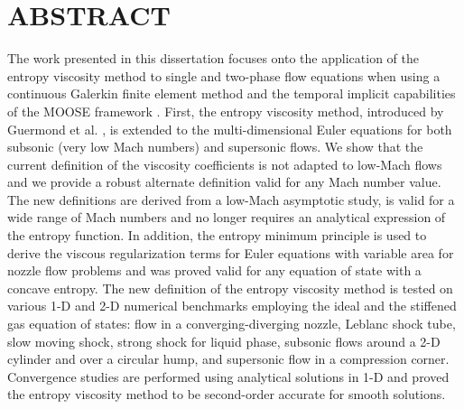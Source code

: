 %
%
%

\chapter*{ABSTRACT}

\pagestyle{plain} %
\setcounter{page}{2}

The work presented in this dissertation focuses onto the application of the entropy viscosity method to single and two-phase flow equations when using a continuous Galerkin finite element method and the temporal implicit capabilities of the MOOSE framework \cite{Moose}. First,  
the entropy viscosity method, introduced by Guermond et al. \cite{jlg1, jlg2}, is extended to the multi-dimensional Euler 
equations for both subsonic (very low Mach numbers) and supersonic flows. 
We show that the current definition of the viscosity coefficients \cite{jlg1, jlg2} is not adapted to low-Mach flows 
and we provide a robust alternate definition valid for any Mach number value. The new definitions are derived from a 
low-Mach asymptotic study, is valid for a wide range of Mach numbers and no longer requires an analytical expression of the entropy function. In addition, the entropy minimum principle is used to derive 
the viscous regularization terms for Euler equations with variable area for nozzle flow problems and was proved valid for any equation of state with a concave entropy. 
The new definition of the entropy viscosity method is tested on various 1-D and 2-D numerical benchmarks employing the ideal and the stiffened gas equation of states: flow in a converging-diverging nozzle, Leblanc shock tube, slow moving 
shock, strong shock for liquid phase, subsonic flows around a 2-D cylinder and over a circular hump, and supersonic flow in a 
compression corner. Convergence studies are performed using analytical solutions in 1-D and proved the entropy viscosity method to be second-order accurate for smooth solutions.

